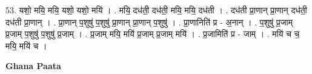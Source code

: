 \documentclass[17pt]{extarticle}
\begin{document}
53. यशो॒ मयि॒ मयि॒ यशो॒ यशो॒ मयि॑ । . मयि॒ दध॑ती॒ दध॑ती॒ मयि॒ मयि॒ दध॑ती । . दध॑ती प्रा॒णान् प्रा॒णान् दध॑ती॒ दध॑ती प्रा॒णान् । . प्रा॒णान् प॒शुषु॑ प॒शुषु॑ प्रा॒णान् प्रा॒णान् प॒शुषु॑ । . प्रा॒णानिति॑ प्र - अ॒नान् । . प॒शुषु॑ प्र॒जाम् प्र॒जाम् प॒शुषु॑ प॒शुषु॑ प्र॒जाम् । . प्र॒जाम् मयि॒ मयि॑ प्र॒जाम् प्र॒जाम् मयि॑ । . प्र॒जामिति॑ प्र - जाम् । . मयि॑ च च॒ मयि॒ मयि॑ च । \newline

\textbf{Ghana Paata } \newline
\end{document}

